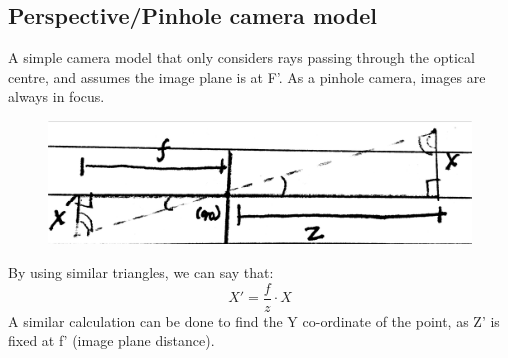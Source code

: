 \subsection{Perspective/Pinhole camera model}\label{subsec:Camera_Model}
A simple camera model that only considers rays passing through the optical centre, and assumes the image plane is at F'. As a pinhole camera, images are always in focus. 
\begin{figure}[H]
    \centering
    \includegraphics[width = \textwidth]{Images/Pinhole_Model}
\end{figure}
By using similar triangles, we can say that:
\begin{equation}
    X' = \frac{f}{z}\cdot X
\end{equation}
A similar calculation can be done to find the Y co-ordinate of the point, as Z' is fixed at f' (image plane distance).


